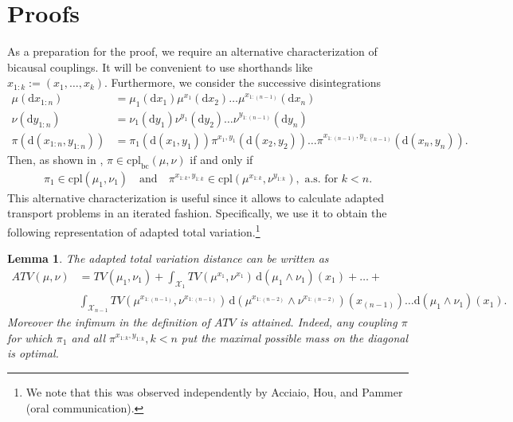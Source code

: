 \documentclass[10pt, A4paper]{amsart}
\newtheorem{lemma}[theorem]{Lemma}
\theoremstyle{definition}
\newcommand{\X}{\mathcal X}
\newcommand{\cpl}{\mathrm{cpl}}
\newcommand{\cplbc}{\cpl_{\mathrm{bc}}}
\numberwithin{equation}{section}
\begin{document}
\section{Proofs}
As a preparation for the proof, we require an alternative characterization of bicausal couplings. It will be convenient to use shorthands like $x_{1:k}:=(x_1,\ldots,x_k) $.
Furthermore, we consider the successive  disintegrations
\begin{align*}
    \mu\left(\mathrm{d}x_{1:n}\right) &= \mu_1\left(\mathrm{d}x_1\right)  \mu^{x_1}\left(\mathrm{d}x_2 \right) \ldots \mu^{x_{1:(n-1)}} \left(\mathrm{d}x_n \right) \\
    \nu\left(\mathrm{d}y_{1:n}\right) &= \nu_1\left(\mathrm{d}y_1\right)  \nu^{y_1}\left(\mathrm{d}y_2 \right) \ldots \nu^{y_{1:(n-1)}} \left(\mathrm{d}y_n \right) \\
    \pi\left(\mathrm{d}(x_{1:n},y_{1:n})\right) &= \pi_1\left(\mathrm{d}(x_1,y_1)\right)  \pi^{x_1,y_1}\left(\mathrm{d}(x_2,y_2) \right) \ldots \pi^{x_{1:(n-1)},y_{1:(n-1)}} \left(\mathrm{d}(x_n,y_n) \right).
\end{align*}    
Then, as shown in \cite[Proposition 5.1]{BaBeLiZa17},  $\pi\in \cplbc(\mu, \nu)$ if and only if 
\begin{align}\label{eq:iteratechar}
   \pi_1\in \cpl(\mu_1, \nu_1) \quad \text{and} \quad \pi^{x_{1:k},y_{1:k} }\in \cpl(\mu^{x_{1:k}}, \nu^{y_{1:k}}), \text{ a.s. for $k< n$.} 
\end{align}
This alternative characterization is useful since it allows to calculate adapted transport problems in an iterated fashion.
Specifically, we use it to obtain the following representation of adapted total variation.\footnote{We note that this was observed independently by Acciaio, Hou, and Pammer (oral communication).}
\begin{lemma}\label{le:ATVsimple}
   The adapted total variation distance can be written as
    \begin{align*}
        ATV(\mu,\nu) & = TV(\mu_1,\nu_1) + \int_{\X_1} TV(\mu^{x_1}, \nu^{x_1}) \, \mathrm{d}(\mu_1 \wedge \nu_1)(x_1) + \ldots + \\
        & \int_{\X_{n-1}} TV(\mu^{x_{1:(n-1)}},\nu^{x_{1:(n-1)}}) \, \mathrm{d}(\mu^{x_{1:(n-2)}} \wedge \nu^{x_{1:(n-2)}})(x_{(n-1)}) \ldots \mathrm{d}(\mu_1 \wedge \nu_1)(x_1).
    \end{align*}
    Moreover the infimum in the definition of $ATV$ is attained.
    Indeed, any coupling $\pi$ for which $\pi_1$ and all $ \pi^{x_{1:k},y_{1:k}}, k< n$ put the maximal possible mass on the diagonal is optimal. 
\end{lemma}
\end{document}
